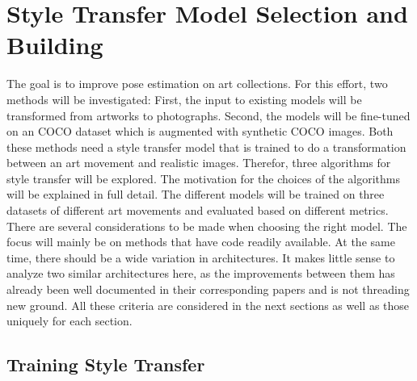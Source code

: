 \graphicspath{{images/chapter2/}}

\chapter{Style Transfer Model Selection and Building}
\label{chap:style_transfer}

The goal is to improve pose estimation on art collections.
For this effort, two methods will be investigated: 
First, the input to existing models will be transformed from artworks to photographs.
Second, the models will be fine-tuned on an COCO dataset which is augmented with synthetic COCO images.
Both these methods need a style transfer model that is trained to do a transformation between an art movement and realistic images.
Therefor, three algorithms for style transfer will be explored.
The motivation for the choices of the algorithms will be explained in full detail.
The different models will be trained on three datasets of different art movements and evaluated based on different metrics.
There are several considerations to be made when choosing the right model.
The focus will mainly be on methods that have code readily available.
At the same time, there should be a wide variation in architectures.
It makes little sense to analyze two similar architectures here, as the improvements between them has already been well documented in their corresponding papers and is not threading new ground.
All these criteria are considered in the next sections as well as those uniquely for each section.

\section{Training Style Transfer}
\label{sec:baseline_style_transfer}

